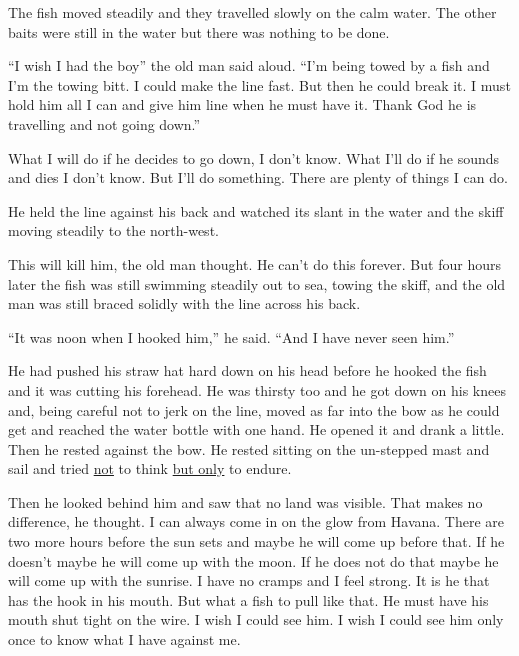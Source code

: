 The fish moved steadily and they travelled slowly on the \gls{calm} water. The
other baits were still in the water but there was nothing to be done.

``I wish I had the boy'' the old man said aloud. ``I'm being \gls{towed} by
a fish and I'm the towing \gls{bitt}. I could make the line fast. But then
he could break it. I must hold him all I can and give him line when he must
have it. Thank God he is travelling and not going down.''

What I will do if he decides to go down, I don't know. What I'll do if he
\glspl{sound} and dies I don't know. But I'll do something. There are \gls{plenty} of
things I can do.

He held the line against his back and watched its slant in the water and the
skiff moving steadily to the north-west.

This will kill him, the old man thought. He can't do this forever. But four
hours later the fish was still swimming steadily out to sea, towing the
skiff, and the old man was still \gls{braced} \gls{solidly} with the line
across his back.

``It was noon when I hooked him,'' he said. ``And I have never seen him.''

He had pushed his \gls{straw} hat hard down on his head before he hooked the
fish and it was cutting his \gls{forehead}. He was \gls{thirsty} too and he
got down on his knees and, being careful not to \gls{jerk} on the line,
moved as far into the bow as he could get and reached the water bottle with
one hand. He opened it and drank a little. Then he rested against the bow.
He rested sitting on the \gls{un-stepped} mast and sail and tried \uline{not}
  to think \uline{but only} to \gls{endure}.


Then he looked behind him and saw that no land was \gls{visible}. That makes no
difference, he thought. I can always come in on the \gls{glow} from Havana.
There are two more hours before the sun sets and maybe he will come up
before that. If he doesn't maybe he will come up with the moon. If he does
not do that maybe he will come up with the sunrise. I have no \glspl{cramp}
and I feel strong. It is he that has the hook in his mouth. But what a fish
to pull like that. He must have his mouth shut \gls{tight} on the wire. I
wish I could see him. I wish I could see him only once to know what I have
against me.


